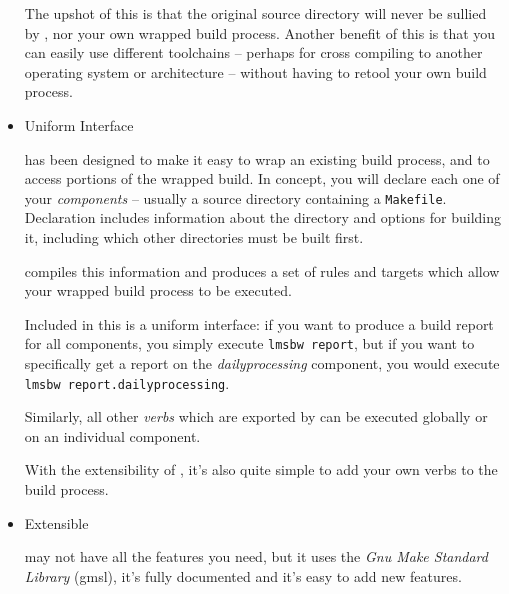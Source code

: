 \begin{itemize}
  The upshot of this is that the original source directory will never
  be sullied by \lmsbw, nor your own wrapped build process.  Another
  benefit of this is that you can easily use different toolchains --
  perhaps for cross compiling to another operating system or
  architecture -- without having to retool your own build process.

\item Uniform Interface

  \lmsbw has been designed to make it easy to wrap an existing build
  process, and to access portions of the wrapped build.  In concept,
  you will declare each one of your \emph{components} -- usually a source
  directory containing a \texttt{Makefile}.  Declaration includes
  information about the directory and options for building it,
  including which other directories must be built first.

  \lmsbw compiles this information and produces a set of \make rules
  and targets which allow your wrapped build process to be executed.

  Included in this is a uniform interface: if you want to produce a
  build report for all components, you simply execute \texttt{lmsbw
    report}, but if you want to specifically get a report on the
  \emph{dailyprocessing} component, you would execute \texttt{lmsbw
    report.dailyprocessing}.

  Similarly, all other \emph{verbs} which are exported by \lmsbw can
  be executed globally or on an individual component.

  With the extensibility of \lmsbw, it's also quite simple to add your
  own verbs to the build process.

\item Extensible

  \lmsbw may not have all the features you need, but it uses the
  \emph{Gnu Make Standard Library} (gmsl), it's fully documented and
  it's easy to add new features.

\end{itemize}
